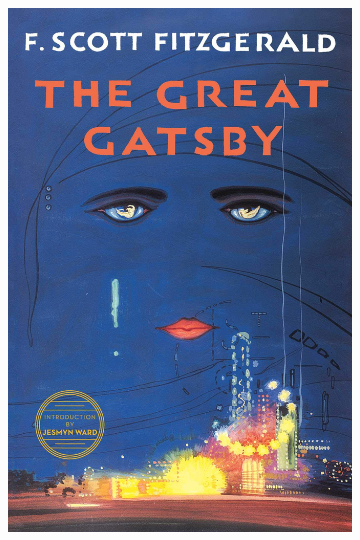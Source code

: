 \documentclass{beamer}
\begin{document}
\begin{frame}
\begin{figure}[t]
\begin{subfigure}[b]{.3\textwidth}
      \includegraphics[width=.9\textwidth]{images/great-gatsby.jpg}
    \end{subfigure}   
  \end{figure}
\end{frame}
\end{document}
